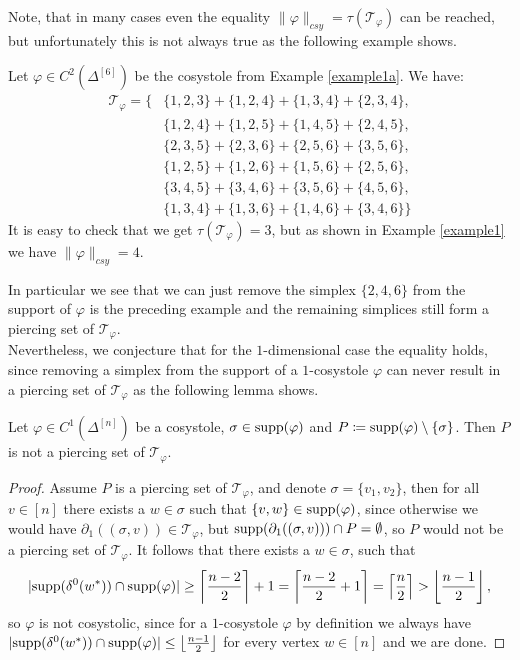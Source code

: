 Note, that in many cases even the equality \(\|\varphi\|_{csy}=\tau(\mathcal{T}_{\varphi})\) can be reached, but unfortunately this is not always true as the following example shows.

\begin{expl}\label{example1b}
Let \(\varphi\in C^2(\Delta^{[6]})\) be the cosystole from Example \ref{example1a}. We have:
\begin{align*}
\mathcal{T}_{\varphi}=\{&\{1,2,3\}+\{1,2,4\}+\{1,3,4\}+\{2,3,4\},\\
&\{1,2,4\}+\{1,2,5\}+\{1,4,5\}+\{2,4,5\},\\
&\{2,3,5\}+\{2,3,6\}+\{2,5,6\}+\{3,5,6\},\\
&\{1,2,5\}+\{1,2,6\}+\{1,5,6\}+\{2,5,6\},\\
&\{3,4,5\}+\{3,4,6\}+\{3,5,6\}+\{4,5,6\},\\
&\{1,3,4\}+\{1,3,6\}+\{1,4,6\}+\{3,4,6\}\}
\end{align*}
It is easy to check that we get \(\tau(\mathcal{T}_{\varphi})=3\), but as shown in Example \ref{example1} we have \(\|\varphi\|_{csy}=4\).
\end{expl}
In particular we see that we can just remove the simplex \(\{2,4,6\}\) from the support of \(\varphi\) is the preceding example and the remaining simplices still form a piercing set of \(\mathcal{T}_{\varphi}\).\\
Nevertheless, we conjecture that for the \(1\)-dimensional case the equality holds, since removing a simplex from the support of a \(1\)-cosystole \(\varphi\) can never result in a piercing set of \(\mathcal{T}_{\varphi}\) as the following lemma shows.

\begin{lem}\label{lemma211}
Let \(\varphi\in C^1(\Delta^{[n]})\) be a cosystole, \(\sigma\in\mathrm{supp}(\varphi)\) and \(P\coloneqq \mathrm{supp}(\varphi)\setminus\{\sigma\}\). Then \(P\) is not a piercing set of \(\mathcal{T}_{\varphi}\).
\begin{proof}
Assume \(P\) is a piercing set of \(\mathcal{T}_{\varphi}\), and denote \(\sigma=\{v_1,v_2\}\), then for all \(v\in[n]\) there exists a \(w\in\sigma\) such that \(\{v,w\}\in\mathrm{supp}(\varphi)\), since otherwise we would have \(\partial_1((\sigma,v))\in\mathcal{T}_{\varphi}\), but \(\mathrm{supp}(\partial_1((\sigma,v)))\cap P=\emptyset\), so \(P\) would not be a piercing set of \(\mathcal{T}_{\varphi}\). It follows that there exists a \(w\in\sigma\), such that
\[
|\mathrm{supp}(\delta^0(w^*))\cap\mathrm{supp}(\varphi)|\geq\left\lceil\frac{n-2}{2}\right\rceil+1=\left\lceil\frac{n-2}{2}+1\right\rceil=\left\lceil\frac{n}{2}\right\rceil>\left\lfloor\frac{n-1}{2}\right\rfloor,
\]
so \(\varphi\) is not cosystolic, since for a \(1\)-cosystole \(\varphi\) by definition we always have\\
\(|\mathrm{supp}(\delta^0(w^*))\cap\mathrm{supp}(\varphi)|\leq\left\lfloor\frac{n-1}{2}\right\rfloor\) for every vertex \(w\in [n]\) and we are done.
\end{proof}
\end{lem}

